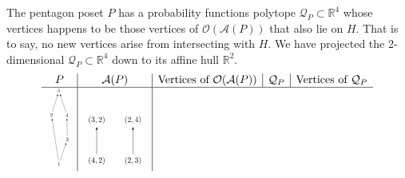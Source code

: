 \documentclass[11pt,a4paper,abstract=yes]{scrartcl}
\theoremstyle{plain}
\newcommand{\RR}{\mathbb{R}}
\newcommand{\prpolytope}[1]{\mathcal{Q}_{#1}}
\newcommand{\orderpolytope}[1]{\mathcal{O}({#1})}
\newcommand{\twoanti}[1]{\mathcal{A}({#1})}
\begin{document}
\begin{mexample}
The pentagon poset \(P\) has a probability functions polytope \(\prpolytope{P} \subset \RR^{4}\) whose vertices
happens to be those vertices of \(\orderpolytope{\twoanti{P}}\) that also lie on \(H\).
That is to say, no new vertices arise from intersecting with \(H\).
We have projected the 2-dimensional \(\prpolytope{P} \subset \RR^{4}\) down to its affine hull
\(\RR^{2}\).
\label{}
\begin{displaymath}\begin{array}{c|c|c|c|c}
 P & \twoanti{P} &  \text{Vertices of } \orderpolytope{\twoanti{P}} & \prpolytope{P}& \text{Vertices of } \prpolytope{P}  \\ \hline
\resizebox{!}{2.5cm}{
 \begin{tikzpicture}[>=latex,line join=bevel,]
\node (node_0) at (20.811bp,6.5307bp) [draw,draw=none] {$1$};
  \node (node_1) at (5.8112bp,104.65bp) [draw,draw=none] {$2$};
  \node (node_2) at (37.811bp,55.592bp) [draw,draw=none] {$3$};
  \node (node_4) at (20.811bp,153.71bp) [draw,draw=none] {$5$};
  \node (node_3) at (36.811bp,104.65bp) [draw,draw=none] {$4$};
  \draw [black,->] (node_0) ..controls (17.765bp,27.051bp) and (11.828bp,65.094bp)  .. (node_1);
  \draw [black,->] (node_0) ..controls (25.016bp,19.17bp) and (28.83bp,29.73bp)  .. (node_2);
  \draw [black,->] (node_1) ..controls (9.4985bp,117.22bp) and (12.81bp,127.61bp)  .. (node_4);
  \draw [black,->] (node_2) ..controls (37.567bp,68.09bp) and (37.35bp,78.313bp)  .. (node_3);
  \draw [black,->] (node_3) ..controls (32.854bp,117.29bp) and (29.264bp,127.85bp)  .. (node_4);
%
\end{tikzpicture}
}

   &
\resizebox{2cm}{!}{
 \begin{tikzpicture}[>=latex,line join=bevel,]
\node (node_0) at (14.39bp,8.3018bp) [draw,draw=none] {$\left(4, 2\right)$};
  \node (node_1) at (14.39bp,60.906bp) [draw,draw=none] {$\left(3, 2\right)$};
  \node (node_2) at (61.39bp,8.3018bp) [draw,draw=none] {$\left(2, 3\right)$};
  \node (node_3) at (61.39bp,60.906bp) [draw,draw=none] {$\left(2, 4\right)$};
  \draw [black,->] (node_0) ..controls (14.39bp,22.834bp) and (14.39bp,32.769bp)  .. (node_1);
  \draw [black,->] (node_2) ..controls (61.39bp,22.834bp) and (61.39bp,32.769bp)  .. (node_3);
%
\end{tikzpicture}
}


\end{array}
\end{displaymath}
\end{mexample}
\end{document}
